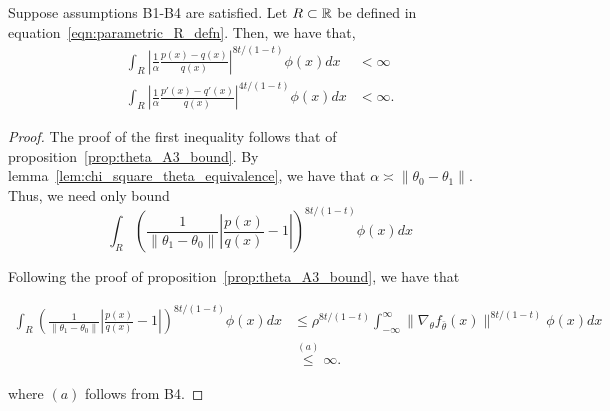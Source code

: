 \documentclass{article}
\begin{document}
\begin{proposition}
\label{prop:theta_A4_bound}
Suppose assumptions B1-B4 are satisfied. Let $R \subset {\mathbb R}$ be defined in equation~\ref{eqn:parametric_R_defn}. Then, we have that,
\begin{align*}
\int_R \left| \frac{1}{\alpha} \frac{p(x) - q(x)}{q(x)} \right|^{8t/(1-t)} \phi(x) dx &< \infty \\
\int_R \left| \frac{1}{\alpha} \frac{p'(x) - q'(x)}{q(x)} \right|^{4t/(1-t)} \phi(x) dx &< \infty.
\end{align*}

\end{proposition}

\begin{proof}
The proof of the first inequality follows that of proposition~\ref{prop:theta_A3_bound}. By lemma~\ref{lem:chi_square_theta_equivalence}, we have that $\alpha \asymp \| \theta_0 - \theta_1 \|$. Thus, we need only bound
\[
\int_R \left( \frac{1}{\| \theta_1 - \theta_0\|} 
        \left| \frac{p(x)}{q(x)} - 1 \right| \right)^{8t/(1-t)} \phi(x) dx
\]

Following the proof of proposition~\ref{prop:theta_A3_bound}, we have that

\begin{align*}
\int_R \left( \frac{1}{\| \theta_1 - \theta_0\|} 
        \left| \frac{p(x)}{q(x)} - 1 \right| \right)^{8t/(1-t)} \phi(x) dx
  &\leq \rho^{8t/(1-t)} \int_{-\infty}^\infty \| \nabla_\theta f_{\bar{\theta}}(x) \|^{8t/(1-t)} \phi(x) dx\\
  & \stackrel{(a)} \leq \infty.
\end{align*}

where $(a)$ follows from B4. 



\end{proof}
\end{document}
